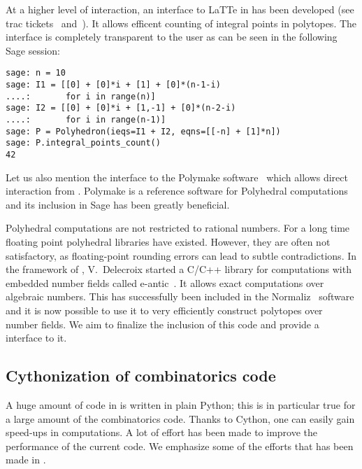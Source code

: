 \documentclass{deliverablereport}
\begin{document}
At a higher level of interaction, an interface to LaTTe in \Sage has
been developed (see trac tickets~\cite{trac-18211}
and~\cite{trac-22497}). It allows efficent counting of
integral points in polytopes. The interface is completely transparent to the
user as can be seen in the following Sage session:
\begin{verbatim}
sage: n = 10
sage: I1 = [[0] + [0]*i + [1] + [0]*(n-1-i)
....:       for i in range(n)]
sage: I2 = [[0] + [0]*i + [1,-1] + [0]*(n-2-i)
....:       for i in range(n-1)]
sage: P = Polyhedron(ieqs=I1 + I2, eqns=[[-n] + [1]*n])
sage: P.integral_points_count()
42
\end{verbatim}
Let us also mention the \Sage interface to the Polymake
software~\cite{polymake-code} which allows direct interaction from
\Sage. Polymake is a reference software for Polyhedral computations
and its inclusion in Sage has been greatly beneficial.

Polyhedral computations are not restricted to rational numbers. For a long time
floating point polyhedral libraries have existed. However, they are often not
satisfactory, as floating-point rounding errors can lead to subtle contradictions. In the framework
of \ODK, V.~Delecroix started a C/C++ library for computations with embedded
number fields called e-antic~\cite{eantic-code}. It allows exact computations
over algebraic numbers. This has successfully been included in the
Normaliz~\cite{normaliz-code} software and it is now possible to use
it to very efficiently construct polytopes over number fields. We aim to
finalize the inclusion of this code and provide a \Sage interface to it.


\subsection{Cythonization of combinatorics code}

A huge amount of code in \Sage is written in plain Python; this is in
particular true for a large amount of the combinatorics code. Thanks to
Cython, one can easily gain speed-ups in computations. A lot of effort has
been made to improve the performance of the current code. We emphasize
some of the efforts that has been made in \ODK.
\end{document}

